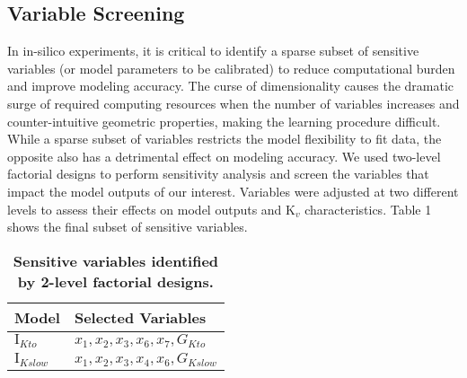 \documentclass[10pt,letterpaper]{article}
\begin{document}
\subsection*{Variable Screening}
In in-silico experiments, it is critical to identify a sparse subset of sensitive variables (or model parameters to be calibrated) to reduce computational burden and improve modeling accuracy. The curse of dimensionality causes the dramatic surge of required computing resources when the number of variables increases and counter-intuitive geometric properties, making the learning procedure difficult. While a sparse subset of variables restricts the model flexibility to fit data, the opposite also has a detrimental effect on modeling accuracy. We used two-level factorial designs to perform sensitivity analysis and screen the variables that impact the model outputs of our interest. Variables were adjusted at two different levels to assess their effects on model outputs and $\text{K}_{v}$ characteristics. Table 1 shows the final subset of sensitive variables.

\begin{table}
    \centering
    \caption{\bf{Sensitive variables identified by 2-level factorial designs.}}
    \label{table1}
    \begin{tabular}{ll}
        \hline
        Model & Selected Variables  \\ 
        \hline
        $\text{I}_{Kto}$ & $x_1, x_2, x_3, x_6, x_7, G_{Kto}$ \\
        $\text{I}_{Kslow}$ & $x_1, x_2, x_3, x_4, x_6, G_{Kslow}$ \\
        \hline
    \end{tabular}
\end{table}
\end{document}
